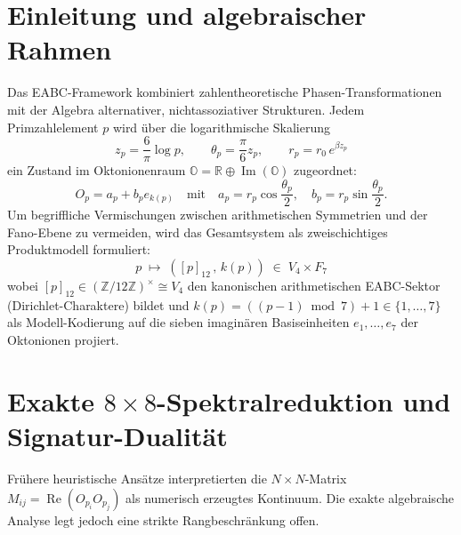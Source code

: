 \documentclass[11pt,a4paper]{article}
\theoremstyle{remark}
\begin{document}
	\section{Einleitung und algebraischer Rahmen}
	
	Das EABC-Framework kombiniert zahlentheoretische Phasen-Transformationen mit der Algebra alternativer, nichtassoziativer Strukturen. Jedem Primzahlelement $p$ wird über die logarithmische Skalierung
	\begin{equation}
		z_p = \frac{6}{\pi} \log p, \qquad \theta_p = \frac{\pi}{6} z_p, \qquad r_p = r_0 \, e^{\beta z_p}
	\end{equation}
	ein Zustand im Oktonionenraum $\mathbb{O} = \mathbb{R} \oplus \operatorname{Im}(\mathbb{O})$ zugeordnet:
	\begin{equation}
		O_p = a_p + b_p e_{k(p)} \quad \text{mit} \quad a_p = r_p \cos\frac{\theta_p}{2}, \quad b_p = r_p \sin\frac{\theta_p}{2}.
	\end{equation}
	Um begriffliche Vermischungen zwischen arithmetischen Symmetrien und der Fano-Ebene zu vermeiden, wird das Gesamtsystem als zweischichtiges Produktmodell formuliert:
	\begin{equation}
		p \;\longmapsto\; \left( [p]_{12} \,,\, k(p) \right) \;\in\; V_4 \times F_7
	\end{equation}
	wobei $[p]_{12} \in (\mathbb{Z}/12\mathbb{Z})^\times \cong V_4$ den kanonischen arithmetischen EABC-Sektor (Dirichlet-Charaktere) bildet und $k(p) = ((p-1) \bmod 7) + 1 \in \{1,\dots,7\}$ als Modell-Kodierung auf die sieben imaginären Basiseinheiten $e_1, \dots, e_7$ der Oktonionen projiert.
	
	\section{Exakte $8 \times 8$-Spektralreduktion und Signatur-Dualität}
	
	Frühere heuristische Ansätze interpretierten die $N \times N$-Matrix $M_{ij} = \operatorname{Re}(O_{p_i} O_{p_j})$ als numerisch erzeugtes Kontinuum. Die exakte algebraische Analyse legt jedoch eine strikte Rangbeschränkung offen.
	
\end{document}
